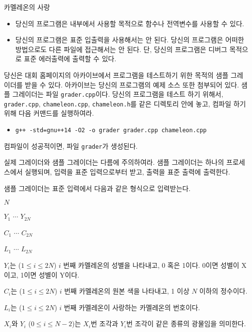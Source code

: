 \begin{problem}{카멜레온의 사랑}
\begin{itemize}
\begin{itemize}
		\end{itemize}
		
	\end{itemize}
	
	\Notes
	
	\begin{itemize}
		\item 당신의 프로그램은 내부에서 사용할 목적으로 함수나 전역변수를 사용할 수 있다.
		\item 당신의 프로그램은 표준 입출력을 사용해서는 안 된다. 당신의 프로그램은 어떠한 방법으로도 다른 파일에 접근해서는 안 된다. 단, 당신의 프로그램은 디버그 목적으로 표준 에러출력에 출력할 수 있다.
	\end{itemize}
	
	당신은 대회 홈페이지의 아카이브에서 프로그램을 테스트하기 위한 목적의 샘플 그레이더를 받을 수 있다. 아카이브는 당신의 프로그램의 예제 소스 또한 첨부되어 있다.
	샘플 그레이더는 파일 \texttt{grader.cpp}이다. 당신의 프로그램을 테스트 하기 위해서, \texttt{grader.cpp}, \texttt{chameleon.cpp}, \texttt{chameleon.h}를 같은 디렉토리 안에 놓고, 컴파일 하기 위해 다음 커맨드를 실행하여라.
	
	\begin{itemize}
		\item \texttt{g++ -std=gnu++14 -O2 -o grader grader.cpp chameleon.cpp}
	\end{itemize}
	
	컴파일이 성공적이면, 파일 \texttt{grader}가 생성된다.
	
	실제 그레이더와 샘플 그레이더는 다름에 주의하여라. 샘플 그레이더는 하나의 프로세스에서 실행되며, 입력을 표준 입력으로부터 받고, 출력을 표준 출력에 출력한다.
	
	\InputFile
	
	샘플 그레이더는 표준 입력에서 다음과 같은 형식으로 입력받는다.
	
	$N$
	
	$Y_1$ $\cdots$ $Y_{2N}$
	
	$C_1$ $\cdots$ $C_{2N}$
	
	$L_1$ $\cdots$ $L_{2N}$


	$Y_i$는 ($1 \le i \le 2N$) $i$ 번째 카멜레온의 성별을 나타내고, 0 혹은 1이다. 0이면 성별이 X이고, 1이면 성별이 Y이다.
	
	$C_i$는 ($1 \le i \le 2N$) $i$ 번째 카멜레온의 원본 색을 나타내고, 1 이상 $N$ 이하의 정수이다.
	
	$L_i$는 ($1 \le i \le 2N$) $i$ 번째 카멜레온이 사랑하는 카멜레온의 번호이다.
	
	$X_i$와 $Y_i$ ($0 \le i \le N-2$)는 $X_i$번 조각과 $Y_i$번 조각이 같은 종류의 광물임을 의미한다.
	

\end{problem}
